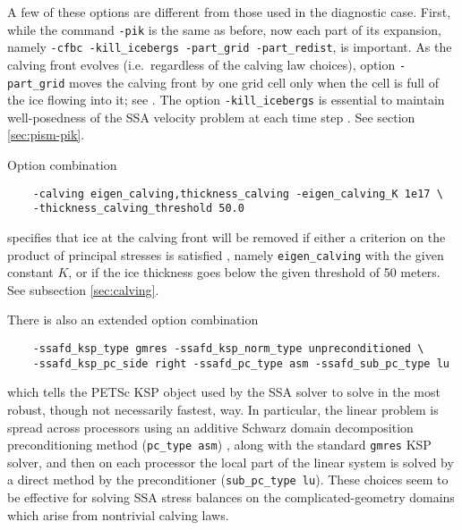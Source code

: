A few of these options are different from those used in the diagnostic case.  First, while the command \texttt{-pik} is the same as before, now each part of its expansion, namely \texttt{-cfbc -kill_icebergs -part_grid -part_redist}, is important.  As the calving front evolves (i.e.~regardless of the calving law choices), option \texttt{-part_grid} moves the calving front by one grid cell only when the cell is full of the ice flowing into it; see \cite{Albrechtetal2011}.  The option \texttt{-kill_icebergs} is essential to maintain well-posedness of the SSA velocity problem at each time step \cite{Winkelmannetal2011}.  See section \ref{sec:pism-pik}.

Option combination
\begin{verbatim}
    -calving eigen_calving,thickness_calving -eigen_calving_K 1e17 \
    -thickness_calving_threshold 50.0
\end{verbatim}%
specifies that ice at the calving front will be removed if either a criterion on the product of principal stresses is satisfied \cite{Levermannetal2012}, namely \texttt{eigen_calving} with the given constant $K$, or if the ice thickness goes below the given threshold of 50 meters.  See subsection \ref{sec:calving}.

There is also an extended option combination
\begin{verbatim}
    -ssafd_ksp_type gmres -ssafd_ksp_norm_type unpreconditioned \
    -ssafd_ksp_pc_side right -ssafd_pc_type asm -ssafd_sub_pc_type lu
\end{verbatim}%
which tells the PETSc KSP object used by the SSA solver to solve in the most robust, though not necessarily fastest, way.  In particular, the linear problem is spread across processors using an additive Schwarz domain decomposition preconditioning method (\texttt{pc_type asm}) \cite{Smithetal1996}, along with the standard \texttt{gmres} KSP solver, and then on each processor the local part of the linear system is solved by a direct method by the preconditioner (\texttt{sub_pc_type lu}).  These choices seem to be effective for solving SSA stress balances on the complicated-geometry domains which arise from nontrivial calving laws.



